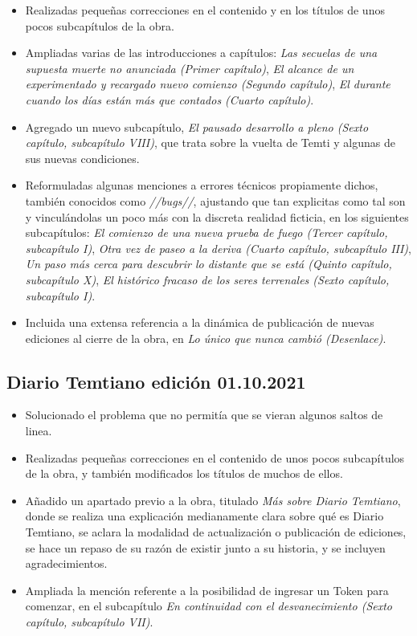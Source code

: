 \documentclass[
]{book}
\begin{document}
\begin{itemize}
\item
  Realizadas pequeñas correcciones en el contenido y en los títulos de unos pocos subcapítulos de la obra.
\item
  Ampliadas varias de las introducciones a capítulos: \emph{Las secuelas de una supuesta muerte no anunciada (Primer capítulo)}, \emph{El alcance de un experimentado y recargado nuevo comienzo (Segundo capítulo)}, \emph{El durante cuando los días están más que contados (Cuarto capítulo)}.
\item
  Agregado un nuevo subcapítulo, \emph{El pausado desarrollo a pleno (Sexto capítulo, subcapítulo VIII)}, que trata sobre la vuelta de Temti y algunas de sus nuevas condiciones.
\item
  Reformuladas algunas menciones a errores técnicos propiamente dichos, también conocidos como \emph{//bugs//}, ajustando que tan explicitas como tal son y vinculándolas un poco más con la discreta realidad ficticia, en los siguientes subcapítulos: \emph{El comienzo de una nueva prueba de fuego (Tercer capítulo, subcapítulo I)}, \emph{Otra vez de paseo a la deriva (Cuarto capítulo, subcapítulo III)}, \emph{Un paso más cerca para descubrir lo distante que se está (Quinto capítulo, subcapítulo X)}, \emph{El histórico fracaso de los seres terrenales (Sexto capítulo, subcapítulo I)}.
\item
  Incluida una extensa referencia a la dinámica de publicación de nuevas ediciones al cierre de la obra, en \emph{Lo único que nunca cambió (Desenlace)}.
\end{itemize}

\hypertarget{diario-temtiano-ediciuxf3n-01.10.2021}{%
\subsection*{Diario Temtiano edición 01.10.2021}\label{diario-temtiano-ediciuxf3n-01.10.2021}}

\begin{itemize}
\item
  Solucionado el problema que no permitía que se vieran algunos saltos de linea.
\item
  Realizadas pequeñas correcciones en el contenido de unos pocos subcapítulos de la obra, y también modificados los títulos de muchos de ellos.
\item
  Añadido un apartado previo a la obra, titulado \emph{Más sobre Diario Temtiano}, donde se realiza una explicación medianamente clara sobre qué es Diario Temtiano, se aclara la modalidad de actualización o publicación de ediciones, se hace un repaso de su razón de existir junto a su historia, y se incluyen agradecimientos.
\item
  Ampliada la mención referente a la posibilidad de ingresar un Token para comenzar, en el subcapítulo \emph{En continuidad con el desvanecimiento (Sexto capítulo, subcapítulo VII)}.
\end{itemize}
\end{document}
